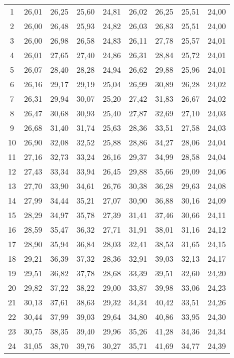 \begin{longtable}{c c c c c c c c c}
1 	& 26,01	& 26,25	& 25,60	& 24,81	& 26,02	& 26,25	& 25,51	& 24,00 \\
2 	& 26,00	& 26,48	& 25,93	& 24,82	& 26,03	& 26,83	& 25,51	& 24,00 \\
3 	& 26,00	& 26,98	& 26,58	& 24,83	& 26,11	& 27,78	& 25,57	& 24,01 \\
4 	& 26,01	& 27,65	& 27,40	& 24,86	& 26,31	& 28,84	& 25,72	& 24,01 \\
5 	& 26,07	& 28,40	& 28,28	& 24,94	& 26,62	& 29,88	& 25,96	& 24,01 \\
6 	& 26,16	& 29,17	& 29,19	& 25,04	& 26,99	& 30,89	& 26,28	& 24,02 \\
7 	& 26,31	& 29,94	& 30,07	& 25,20	& 27,42	& 31,83	& 26,67	& 24,02 \\
8 	& 26,47	& 30,68	& 30,93	& 25,40	& 27,87	& 32,69	& 27,10	& 24,03 \\
9 	& 26,68	& 31,40	& 31,74	& 25,63	& 28,36	& 33,51	& 27,58	& 24,03 \\
10	& 26,90	& 32,08	& 32,52	& 25,88	& 28,86	& 34,27	& 28,06	& 24,04 \\
11	& 27,16	& 32,73	& 33,24	& 26,16	& 29,37	& 34,99	& 28,58	& 24,04 \\
12	& 27,43	& 33,34	& 33,94	& 26,45	& 29,88	& 35,66	& 29,09	& 24,06 \\
13	& 27,70	& 33,90	& 34,61	& 26,76	& 30,38	& 36,28	& 29,63	& 24,08 \\
14	& 27,99	& 34,44	& 35,21	& 27,07	& 30,90	& 36,88	& 30,16	& 24,09 \\
15	& 28,29	& 34,97	& 35,78	& 27,39	& 31,41	& 37,46	& 30,66	& 24,11 \\
16	& 28,59	& 35,47	& 36,32	& 27,71	& 31,91	& 38,01	& 31,16	& 24,12 \\
17	& 28,90	& 35,94	& 36,84	& 28,03	& 32,41	& 38,53	& 31,65	& 24,15 \\
18	& 29,21	& 36,39	& 37,32	& 28,36	& 32,91	& 39,03	& 32,13	& 24,17 \\
19	& 29,51	& 36,82	& 37,78	& 28,68	& 33,39	& 39,51	& 32,60	& 24,20 \\
20	& 29,82	& 37,22	& 38,22	& 29,00	& 33,87	& 39,98	& 33,06	& 24,23 \\
21	& 30,13	& 37,61	& 38,63	& 29,32	& 34,34	& 40,42	& 33,51	& 24,26 \\
22	& 30,44	& 37,99	& 39,03	& 29,64	& 34,80	& 40,86	& 33,95	& 24,30 \\
23	& 30,75	& 38,35	& 39,40	& 29,96	& 35,26	& 41,28	& 34,36	& 24,34 \\
24	& 31,05	& 38,70	& 39,76	& 30,27	& 35,71	& 41,69	& 34,77	& 24,39 \\

\end{longtable}
